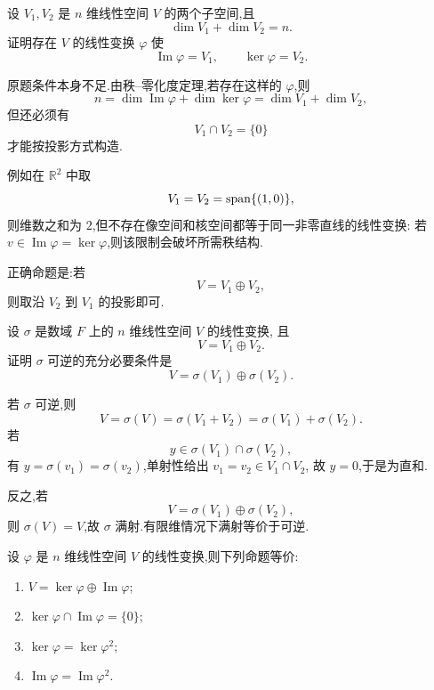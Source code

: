 \begin{example}
设 $V_1,V_2$ 是 $n$ 维线性空间 $V$ 的两个子空间,且
\[
\dim V_1+\dim V_2=n.
\]
证明存在 $V$ 的线性变换 $\varphi$ 使
\[
\operatorname{Im}\varphi=V_1,
\qquad
\ker\varphi=V_2.
\]
\end{example}
\exampleblank

\begin{solution}
原题条件本身不足.由秩--零化度定理,若存在这样的 $\varphi$,则
\[
n
=
\dim\operatorname{Im}\varphi+\dim\ker\varphi
=
\dim V_1+\dim V_2,
\]
但还必须有
\[
V_1\cap V_2=\{0\}
\]
才能按投影方式构造.

例如在 $\mathbb{R}^2$ 中取
\[
V_1=V_2=\operatorname{span}\{(1,0)\},
\]
则维数之和为 $2$,但不存在像空间和核空间都等于同一非零直线的线性变换:
若 $v\in\operatorname{Im}\varphi=\ker\varphi$,则该限制会破坏所需秩结构.

正确命题是:若
\[
V=V_1\oplus V_2,
\]
则取沿 $V_2$ 到 $V_1$ 的投影即可.
\end{solution}


\begin{example}[\markstar]
设 $\sigma$ 是数域 $F$ 上的 $n$ 维线性空间 $V$ 的线性变换,
且
\[
V=V_1\oplus V_2.
\]
证明 $\sigma$ 可逆的充分必要条件是
\[
V=\sigma(V_1)\oplus\sigma(V_2).
\]
\end{example}
\exampleblank

\begin{solution}
若 $\sigma$ 可逆,则
\[
V=\sigma(V)=\sigma(V_1+V_2)=\sigma(V_1)+\sigma(V_2).
\]
若
\[
y\in\sigma(V_1)\cap\sigma(V_2),
\]
有 $y=\sigma(v_1)=\sigma(v_2)$,单射性给出 $v_1=v_2\in V_1\cap V_2$,
故 $y=0$,于是为直和.

反之,若
\[
V=\sigma(V_1)\oplus\sigma(V_2),
\]
则 $\sigma(V)=V$,故 $\sigma$ 满射.有限维情况下满射等价于可逆.
\end{solution}


\begin{proposition}[\marktwostar]
设 $\varphi$ 是 $n$ 维线性空间 $V$ 的线性变换,则下列命题等价:
\begin{enumerate}
    \item $V=\ker\varphi\oplus\operatorname{Im}\varphi$;
    \item $\ker\varphi\cap\operatorname{Im}\varphi=\{0\}$;
    \item $\ker\varphi=\ker\varphi^2$;
    \item $\operatorname{Im}\varphi=\operatorname{Im}\varphi^2$.
\end{enumerate}
\end{proposition}


